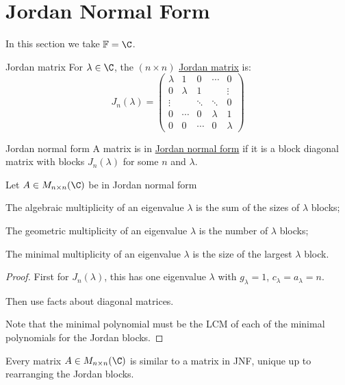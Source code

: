 \documentclass[../Main.tex]{subfiles}
\begin{document}
\section{Jordan Normal Form}
In this section we take $\F = \C$.
\begin{definition}{Jordan matrix}
    For $\lambda \in \C$, the $(n \times n)$ \underline{Jordan matrix} is:
    \begin{equation*}
        J_n(\lambda) =
        \begin{pmatrix}
            \lambda & 1 & 0 & \cdots & 0 \\
            0 & \lambda & 1 &  & \vdots \\
            \vdots & & \ddots & \ddots & 0 \\
            0 & \cdots & 0 & \lambda & 1 \\
            0 & 0 & \cdots & 0 & \lambda
        \end{pmatrix}
    \end{equation*}
\end{definition}
\begin{definition}{Jordan normal form}
    A matrix is in  \underline{Jordan normal form} if it is a block diagonal matrix with blocks $J_n(\lambda)$ for some $n$ and $\lambda$.
\end{definition}
\begin{propositions}{
        Let $A \in M_{n \times n}(\C)$ be in Jordan normal form
        \label{propsJNFMults}
    }
    \item The algebraic multiplicity of an eigenvalue $\lambda$ is the sum of the sizes of $\lambda$ blocks;
    \item The geometric multiplicity of an eigenvalue $\lambda$ is the number of $\lambda$ blocks;
    \item The minimal multiplicity of an eigenvalue $\lambda$ is the size of the largest $\lambda$ block.
\end{propositions}
\begin{proof}
    First for $J_n(\lambda)$, this has one eigenvalue $\lambda$ with $g_\lambda = 1$, $c_\lambda = a_\lambda = n$.

    Then use facts about diagonal matrices.

    Note that the minimal polynomial must be the LCM of each of the minimal polynomials for the Jordan blocks.
\end{proof}
\begin{theorem}
    Every matrix $A \in M_{n \times n}(\C)$ is similar to a matrix in JNF, unique up to rearranging the Jordan blocks.
    \label{thmJNFUnique}
\end{theorem}
\end{document}

